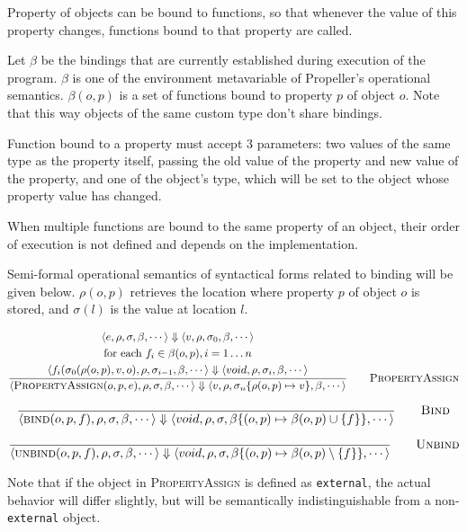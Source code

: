 Property of objects can be bound to functions, so that whenever the value of this property
changes, functions bound to that property are called.

Let $\beta$ be the bindings that are currently established during execution of the program. $\beta$
is one of the environment metavariable of Propeller's operational semantics.
$\beta(o, p)$ is a set of functions bound to property $p$ of object $o$. Note that this way objects
of the same custom type don't share bindings.

Function bound to a property must accept 3 parameters: two values of the same type as the property
itself, passing the old value of the property and new value of the property, and one of the object's
type, which will be set to the object whose property value has changed.

When multiple functions are bound to the same property of an object, their order of execution is not
defined and depends on the implementation.

Semi-formal operational semantics of syntactical forms related to binding will be given below.
$\rho(o, p)$ retrieves the location where property $p$ of object $o$ is stored, and $\sigma(l)$ is
the value at location $l$.

$$
\dfrac{\begin{gathered}
\langle e,\rho,\sigma,\beta,\cdots \rangle \Downarrow
\langle v,\rho,\sigma_0,\beta,\cdots \rangle\\
\textrm{for each } f_i\in\beta(o, p), i=1\dots n\\
\langle f_i(\sigma_0(\rho(o,p),v,o),\rho,\sigma_{i-1},\beta,\cdots \rangle \Downarrow
\langle void,\rho,\sigma_i,\beta,\cdots \rangle
\end{gathered}
}
{\langle \textsc{PropertyAssign}(o,p,e),\rho,\sigma,\beta,\cdots \rangle
\Downarrow
\langle v,\rho,\sigma_n\{\rho(o,p)\mapsto v\},\beta,\cdots \rangle
} \qquad \textsc{PropertyAssign}
$$

$$
\dfrac{}
{\langle \textsc{bind}(o,p,f),\rho,\sigma,\beta,\cdots \rangle
\Downarrow
\langle void,\rho,\sigma,\beta\{(o,p)\mapsto \beta(o,p)\cup \{f\}\},\cdots \rangle
} \qquad \textsc{Bind}
$$

$$
\dfrac{}
{\langle \textsc{unbind}(o,p,f),\rho,\sigma,\beta,\cdots \rangle
\Downarrow
\langle void,\rho,\sigma,\beta\{(o,p)\mapsto \beta(o,p)\setminus \{f\}\},\cdots \rangle
} \qquad \textsc{Unbind}
$$

Note that if the object in \textsc{PropertyAssign} is defined as \texttt{external},
the actual behavior will differ slightly, but will be semantically indistinguishable from a
non-\texttt{external} object.

